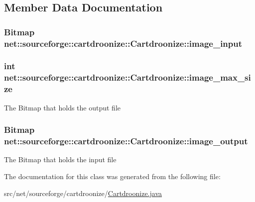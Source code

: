 \subsection{Member Data Documentation}
\hypertarget{classnet_1_1sourceforge_1_1cartdroonize_1_1Cartdroonize_ae5315d354649c37ff7a683f3e1316263}{
\subsubsection[{image\_\-input}]{\setlength{\rightskip}{0pt plus 5cm}Bitmap {\bf net::sourceforge::cartdroonize::Cartdroonize::image\_\-input}}}
\label{classnet_1_1sourceforge_1_1cartdroonize_1_1Cartdroonize_ae5315d354649c37ff7a683f3e1316263}
\hypertarget{classnet_1_1sourceforge_1_1cartdroonize_1_1Cartdroonize_af10d9828c5247f7f12f453c1f7903799}{
\subsubsection[{image\_\-max\_\-size}]{\setlength{\rightskip}{0pt plus 5cm}int {\bf net::sourceforge::cartdroonize::Cartdroonize::image\_\-max\_\-size}}}
\label{classnet_1_1sourceforge_1_1cartdroonize_1_1Cartdroonize_af10d9828c5247f7f12f453c1f7903799}
The Bitmap that holds the output file \hypertarget{classnet_1_1sourceforge_1_1cartdroonize_1_1Cartdroonize_a60dad11dc13c083b5b092c2289a082af}{
\subsubsection[{image\_\-output}]{\setlength{\rightskip}{0pt plus 5cm}Bitmap {\bf net::sourceforge::cartdroonize::Cartdroonize::image\_\-output}}}
\label{classnet_1_1sourceforge_1_1cartdroonize_1_1Cartdroonize_a60dad11dc13c083b5b092c2289a082af}
The Bitmap that holds the input file 

The documentation for this class was generated from the following file:\begin{DoxyCompactItemize}
\item 
src/net/sourceforge/cartdroonize/\hyperlink{Cartdroonize_8java}{Cartdroonize.java}\end{DoxyCompactItemize}
